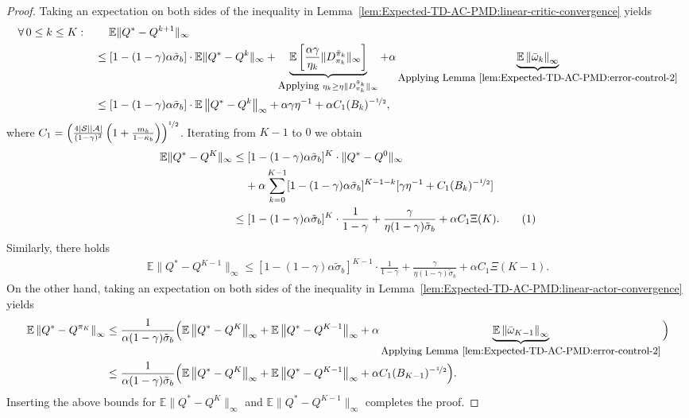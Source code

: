 \documentclass[10pt]{article}
\newcommand{\calA}{\mathcal{A}}
\newcommand{\calS}{\mathcal{S}}
\newcommand{\E}{\mathbb{E}}
\newcommand{\ls}{\left}
\newcommand{\rs}{\right}
\newcommand\numberthis{\addtocounter{equation}{1}\tag{\theequation}}
\theoremstyle{plain}
\theoremstyle{definition}
\begin{document}
\begin{proof}
    Taking an expectation on both sides of the inequality in Lemma~\ref{lem:Expected-TD-AC-PMD:linear-critic-convergence} yields 
    \begin{align*}
        \forall\, 0 \leq k \leq K: \quad &\phantom{=\,\,\,}\E \| Q^* -Q^{k+1} \|_\infty \\
        &\leq [1-(1-\gamma)\alpha\tilde\sigma_b] \cdot \E\| Q^* - Q^k \|_\infty + \underbrace{\E\ls[\frac{\alpha\gamma}{\eta_k} \| D^{\tilde\pi_k}_{\pi_k} \|_\infty\rs]}_{\mbox{\small Applying } \eta_k \geq \eta \| D^{\tilde\pi_k}_{\pi_k} \|_\infty} + \alpha \underbrace{\E\ls\| \bar\omega_k \rs\|_\infty}_{\mbox{\small Applying Lemma~\ref{lem:Expected-TD-AC-PMD:error-control-2}}} \\
        &\leq [1-(1-\gamma) \alpha\tilde\sigma_b] \cdot \E\ls\| Q^* - Q^k \rs\|_\infty + \alpha\gamma\eta^{-1} + \alpha C_1 (B_k)^{-\nicefrac{1}{2}},
    \end{align*}
    where $C_1 = \ls( \frac{4|\calS||\calA|}{(1-\gamma)^2} \ls( 1+\frac{m_b}{1-\kappa_b} \rs) \rs)^{\nicefrac{1}{2}}$. Iterating from $K-1$ to $0$ we obtain
    \begin{align*}
        \E\| Q^* - Q^{K} \|_\infty &\leq [1-(1-\gamma)\alpha\tilde\sigma_b]^K \cdot \| Q^* - Q^0 \|_\infty  \\
        & \;\;\;\; + \alpha \sum_{k=0}^{K-1} [1-(1-\gamma)\alpha\tilde\sigma_b]^{K-1-k} [\gamma\eta^{-1} + C_1 (B_k)^{-\nicefrac{1}{2}}] \\
        &\leq [1-(1-\gamma)\alpha\tilde\sigma_b]^K \cdot \frac{1}{1-\gamma} + \frac{\gamma}{\eta(1-\gamma)\tilde\sigma_b} + \alpha C_1 \Xi(K). \numberthis \label{eq:Expected-TD-AC-PMD:adaptive-stepsize-critic-convergence}
    \end{align*}
    Similarly, there holds
    \begin{align*}
        \E\| Q^* - Q^{K-1} \|_\infty \leq [1-(1-\gamma)\alpha\tilde\sigma_b]^{K-1} \cdot \frac{1}{1-\gamma} + \frac{\gamma}{\eta(1-\gamma)\tilde\sigma_b} + \alpha C_1 \Xi(K-1).
    \end{align*}
    On the other hand, taking an expectation on both sides of the inequality in Lemma~\ref{lem:Expected-TD-AC-PMD:linear-actor-convergence} yields
    \begin{align*}
        \E\ls\| Q^* - Q^{\pi_{K}} \rs\|_\infty &\leq \frac{1}{\alpha(1-\gamma)\tilde\sigma_b} \Big( \E\ls\| Q^* - Q^{K} \rs\|_\infty + \E \ls\| Q^* - Q^{K-1} \rs\|_\infty + \alpha \underbrace{\E\ls\| \bar\omega_{K-1} \rs\|_\infty}_{\mbox{\small Applying Lemma~\ref{lem:Expected-TD-AC-PMD:error-control-2}}} \Big) \\
        & \leq \frac{1}{\alpha(1-\gamma)\tilde\sigma_b} \Big( \E\ls\| Q^* - Q^{K} \rs\|_\infty + \E \ls\| Q^* - Q^{K-1} \rs\|_\infty + \alpha C_1(B_{K-1})^{-\nicefrac{1}{2}} \Big).
    \end{align*}
    Inserting the  above bounds for $\E\| Q^* - Q^K \|_\infty$ and $\E\| Q^* - Q^{K-1} \|_\infty$ completes the proof.
\end{proof}
\end{document}
